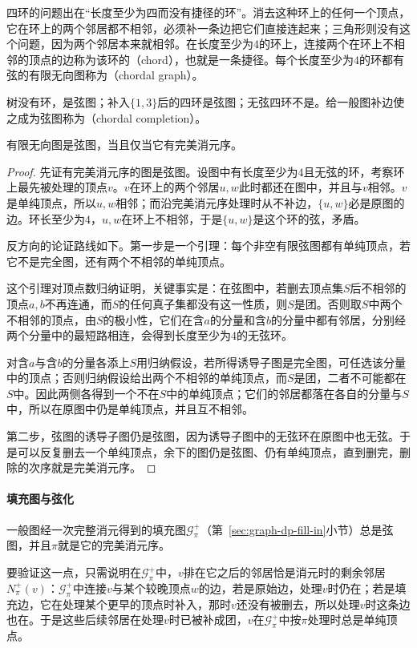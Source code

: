 四环的问题出在“长度至少为四而没有捷径的环”。消去这种环上的任何一个顶点，它在环上的两个邻居都不相邻，必须补一条边把它们直接连起来；三角形则没有这个问题，因为两个邻居本来就相邻。在长度至少为$4$的环上，连接两个在环上不相邻的顶点的边称为该环的（chord），也就是一条捷径。每个长度至少为$4$的环都有弦的有限无向图称为（chordal graph）。

树没有环，是弦图；补入$\{1,3\}$后的四环是弦图；无弦四环不是。给一般图补边使之成为弦图称为（chordal completion）。

\begin{theorem}[弦图与完美消元序]
\label{thm:graph-dp-chordal-peo}
有限无向图是弦图，当且仅当它有完美消元序。
\end{theorem}

\begin{proof}
先证有完美消元序的图是弦图。设图中有长度至少为$4$且无弦的环，考察环上最先被处理的顶点$v$。$v$在环上的两个邻居$u,w$此时都还在图中，并且与$v$相邻。$v$是单纯顶点，所以$u,w$相邻；而沿完美消元序处理时从不补边，$\{u,w\}$必是原图的边。环长至少为$4$，$u,w$在环上不相邻，于是$\{u,w\}$是这个环的弦，矛盾。

反方向的论证路线如下。第一步是一个引理：每个非空有限弦图都有单纯顶点，若它不是完全图，还有两个不相邻的单纯顶点。

这个引理对顶点数归纳证明，关键事实是：在弦图中，若删去顶点集$S$后不相邻的顶点$a,b$不再连通，而$S$的任何真子集都没有这一性质，则$S$是团。否则取$S$中两个不相邻的顶点，由$S$的极小性，它们在含$a$的分量和含$b$的分量中都有邻居，分别经两个分量中的最短路相连，会得到长度至少为$4$的无弦环。

对含$a$与含$b$的分量各添上$S$用归纳假设，若所得诱导子图是完全图，可任选该分量中的顶点；否则归纳假设给出两个不相邻的单纯顶点，而$S$是团，二者不可能都在$S$中。因此两侧各得到一个不在$S$中的单纯顶点；它们的邻居都落在各自的分量与$S$中，所以在原图中仍是单纯顶点，并且互不相邻。

第二步，弦图的诱导子图仍是弦图，因为诱导子图中的无弦环在原图中也无弦。于是可以反复删去一个单纯顶点，余下的图仍是弦图、仍有单纯顶点，直到删完，删除的次序就是完美消元序。
\end{proof}

\paragraph{填充图与弦化}
一般图经一次完整消元得到的填充图$\mathcal G^+_\pi$（第~\ref{sec:graph-dp-fill-in}小节）总是弦图，并且$\pi$就是它的完美消元序。

要验证这一点，只需说明在$\mathcal G^+_\pi$中，$v$排在它之后的邻居恰是消元时的剩余邻居$N^+_\pi(v)$：$\mathcal G^+_\pi$中连接$v$与某个较晚顶点$w$的边，若是原始边，处理$v$时仍在；若是填充边，它在处理某个更早的顶点时补入，那时$v$还没有被删去，所以处理$v$时这条边也在。于是这些后续邻居在处理$v$时已被补成团，$v$在$\mathcal G^+_\pi$中按$\pi$处理时总是单纯顶点。

